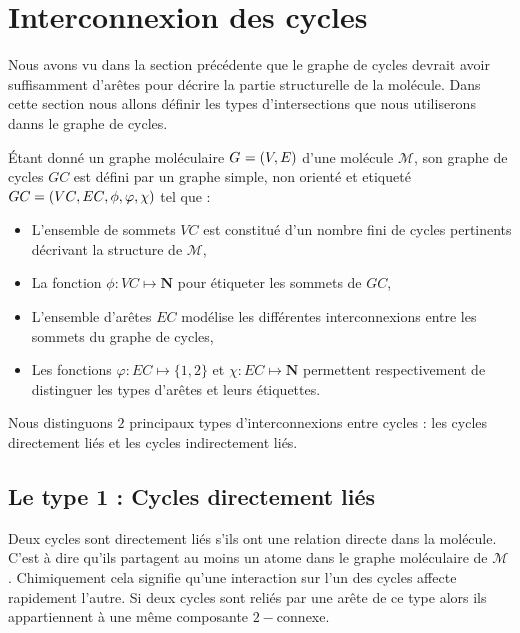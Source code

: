 \section{Interconnexion des cycles}
\label{interconnexion}
Nous avons vu dans la section précédente que le graphe de cycles devrait avoir suffisamment d'arêtes pour décrire la partie structurelle de la molécule. Dans cette section nous allons définir les types d'intersections que nous utiliserons danns le graphe de cycles.


\begin{definition}
Étant donné un graphe moléculaire $G_{}=(V_{},E_{})$ d'une molécule $\mathcal{M}$, son graphe de cycles $GC$ est défini par un graphe simple, non orienté et etiqueté  ~{$GC_{}=(VC_{},EC_{},\phi,\varphi,\chi)$} tel que :

\begin{itemize}
\item L'ensemble de sommets $VC$ est constitué d'un nombre fini de cycles pertinents décrivant la structure de $\mathcal{M}$,
\item  La fonction $\phi : VC \mapsto \mathbf{N}$ pour étiqueter les sommets de $GC$,

\item L'ensemble d'arêtes $EC$ modélise les différentes interconnexions entre les sommets du graphe de cycles,
\item Les fonctions $\varphi: EC \mapsto \{1,2\}$  et $\chi: EC \mapsto \mathbf{N}$ permettent respectivement de distinguer les types d'arêtes et leurs étiquettes.

\end{itemize}
\end{definition}

Nous distinguons $2$ principaux types d'interconnexions entre cycles : les cycles directement liés et les cycles indirectement liés.

\subsection{Le type 1 : Cycles directement liés}

Deux cycles sont directement liés s'ils ont une relation directe dans la molécule. C'est à dire qu'ils partagent au moins un atome dans le graphe moléculaire de $\mathcal{M}$. Chimiquement cela signifie qu'une interaction sur l'un des cycles affecte rapidement l'autre. Si deux cycles sont reliés par une arête de ce type alors ils appartiennent à une même composante $2-$connexe. 

